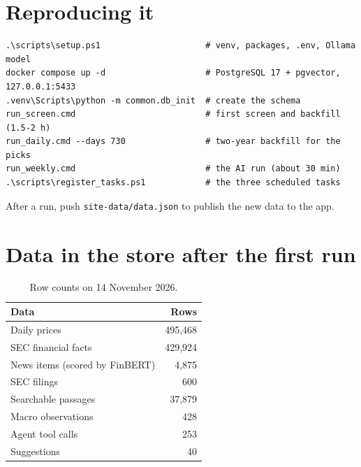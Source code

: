 \documentclass[11pt,a4paper]{article}
\newcommand{\code}[1]{\texttt{#1}}
\begin{document}
\appendix
\section{Reproducing it}

\begin{lstlisting}
.\scripts\setup.ps1                     # venv, packages, .env, Ollama model
docker compose up -d                    # PostgreSQL 17 + pgvector, 127.0.0.1:5433
.venv\Scripts\python -m common.db_init  # create the schema
run_screen.cmd                          # first screen and backfill (1.5-2 h)
run_daily.cmd --days 730                # two-year backfill for the picks
run_weekly.cmd                          # the AI run (about 30 min)
.\scripts\register_tasks.ps1            # the three scheduled tasks
\end{lstlisting}

After a run, push \code{site-data/data.json} to publish the new data to the app.

\section{Data in the store after the first run}

\begin{table}[H]
\centering\small
\begin{tabular}{@{}lr@{}}
\toprule
Data & Rows \\
\midrule
Daily prices                & 495,468 \\
SEC financial facts         & 429,924 \\
News items (scored by FinBERT) & 4,875 \\
SEC filings                 & 600 \\
Searchable passages         & 37,879 \\
Macro observations          & 428 \\
Agent tool calls            & 253 \\
Suggestions                 & 40 \\
\bottomrule
\end{tabular}
\caption{Row counts on 14 November 2026.}
\end{table}

\printbibliography[heading=bibintoc, title={References}]
\end{document}
